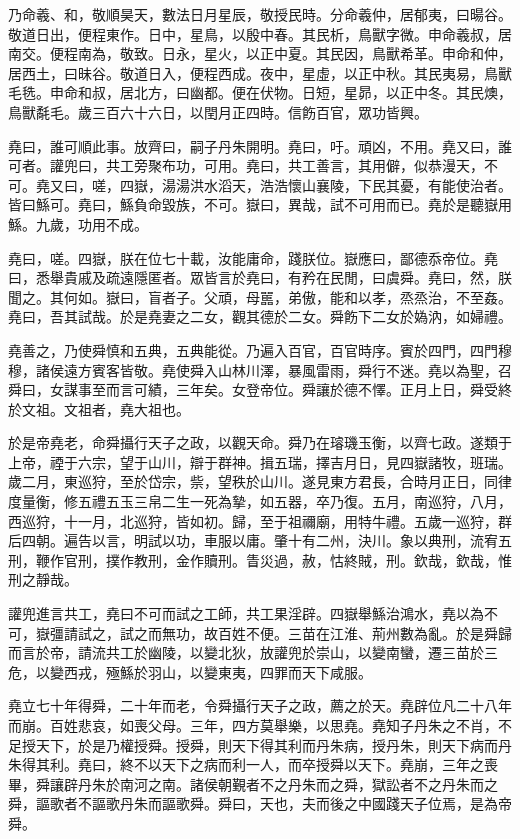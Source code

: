 乃命羲、和，敬順昊天，數法日月星辰，敬授民時。分命羲仲，居郁夷，曰暘谷。敬道日出，便程東作。日中，星鳥，以殷中春。其民析，鳥獸字微。申命羲叔，居南交。便程南為，敬致。日永，星火，以正中夏。其民因，鳥獸希革。申命和仲，居西土，曰昧谷。敬道日入，便程西成。夜中，星虛，以正中秋。其民夷易，鳥獸毛毨。申命和叔，居北方，曰幽都。便在伏物。日短，星昴，以正中冬。其民燠，鳥獸氄毛。歲三百六十六日，以閏月正四時。信飭百官，眾功皆興。

堯曰，誰可順此事。放齊曰，嗣子丹朱開明。堯曰，吁。頑凶，不用。堯又曰，誰可者。讙兜曰，共工旁聚布功，可用。堯曰，共工善言，其用僻，似恭漫天，不可。堯又曰，嗟，四嶽，湯湯洪水滔天，浩浩懷山襄陵，下民其憂，有能使治者。皆曰鯀可。堯曰，鯀負命毀族，不可。嶽曰，異哉，試不可用而已。堯於是聽嶽用鯀。九歲，功用不成。

堯曰，嗟。四嶽，朕在位七十載，汝能庸命，踐朕位。嶽應曰，鄙德忝帝位。堯曰，悉舉貴戚及疏遠隱匿者。眾皆言於堯曰，有矜在民閒，曰虞舜。堯曰，然，朕聞之。其何如。嶽曰，盲者子。父頑，母嚚，弟傲，能和以孝，烝烝治，不至姦。堯曰，吾其試哉。於是堯妻之二女，觀其德於二女。舜飭下二女於媯汭，如婦禮。

堯善之，乃使舜慎和五典，五典能從。乃遍入百官，百官時序。賓於四門，四門穆穆，諸侯遠方賓客皆敬。堯使舜入山林川澤，暴風雷雨，舜行不迷。堯以為聖，召舜曰，女謀事至而言可績，三年矣。女登帝位。舜讓於德不懌。正月上日，舜受終於文祖。文祖者，堯大祖也。

於是帝堯老，命舜攝行天子之政，以觀天命。舜乃在璿璣玉衡，以齊七政。遂類于上帝，禋于六宗，望于山川，辯于群神。揖五瑞，擇吉月日，見四嶽諸牧，班瑞。歲二月，東巡狩，至於岱宗，祡，望秩於山川。遂見東方君長，合時月正日，同律度量衡，修五禮五玉三帛二生一死為摯，如五器，卒乃復。五月，南巡狩，八月，西巡狩，十一月，北巡狩，皆如初。歸，至于祖禰廟，用特牛禮。五歲一巡狩，群后四朝。遍告以言，明試以功，車服以庸。肇十有二州，決川。象以典刑，流宥五刑，鞭作官刑，撲作教刑，金作贖刑。眚災過，赦，怙終賊，刑。欽哉，欽哉，惟刑之靜哉。

讙兜進言共工，堯曰不可而試之工師，共工果淫辟。四嶽舉鯀治鴻水，堯以為不可，嶽彊請試之，試之而無功，故百姓不便。三苗在江淮、荊州數為亂。於是舜歸而言於帝，請流共工於幽陵，以變北狄，放讙兜於崇山，以變南蠻，遷三苗於三危，以變西戎，殛鯀於羽山，以變東夷，四罪而天下咸服。

堯立七十年得舜，二十年而老，令舜攝行天子之政，薦之於天。堯辟位凡二十八年而崩。百姓悲哀，如喪父母。三年，四方莫舉樂，以思堯。堯知子丹朱之不肖，不足授天下，於是乃權授舜。授舜，則天下得其利而丹朱病，授丹朱，則天下病而丹朱得其利。堯曰，終不以天下之病而利一人，而卒授舜以天下。堯崩，三年之喪畢，舜讓辟丹朱於南河之南。諸侯朝覲者不之丹朱而之舜，獄訟者不之丹朱而之舜，謳歌者不謳歌丹朱而謳歌舜。舜曰，天也，夫而後之中國踐天子位焉，是為帝舜。

